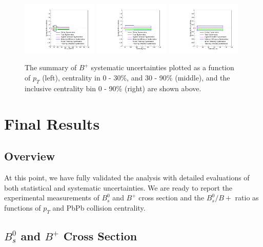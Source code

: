 \begin{figure}[hbtp]
\begin{center}
\includegraphics[width=0.32\textwidth]{Figures/Chapter5/BpPtSyst.pdf}
\includegraphics[width=0.32\textwidth]{Figures/Chapter5/BpCentSyst.pdf}
\includegraphics[width=0.32\textwidth]{Figures/Chapter5/BpIncSyst.pdf}
\caption{The summary of $B^+$ systematic uncertainties plotted as a function of $p_T$ (left), centrality in 0 - 30\%, and 30 - 90\% (middle), and the inclusive centrality bin 0 - 90\% (right) are shown above.}
\label{BPSystSumPlot}
\end{center}
\end{figure}

\clearpage

\section{Final Results} 

\subsection{Overview}

At this point, we have fully validated the analysis with detailed evaluations of both statistical and systematic uncertainties. We are ready to report the experimental measurements of $B^0_s$ and $B^+$ cross section and the $B^0_s/B+$ ratio as functions of $p_T$ and PbPb collision centrality.

\subsection{$B^0_s$ and $B^{+}$ Cross Section}

